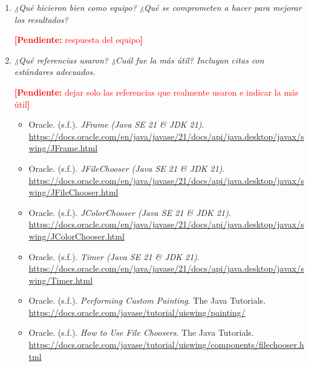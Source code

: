\documentclass[12pt,letterpaper]{article}
\newcommand{\pendiente}[1]{\textcolor{red}{\textbf{[Pendiente:} #1\textbf{]}}}
\newcommand{\enunciado}[1]{\textit{#1}\par}
\begin{document}
\begin{enumerate}
  \item \enunciado{¿Qué hicieron bien como equipo? ¿Qué se comprometen a hacer para mejorar los resultados?}

  \pendiente{respuesta del equipo}

  \item \enunciado{¿Qué referencias usaron? ¿Cuál fue la más útil? Incluyan citas con estándares adecuados.}

  \pendiente{dejar solo las referencias que realmente usaron e indicar la más útil}

  \begin{itemize}
    \item Oracle. (s.f.). \textit{JFrame (Java SE 21 \& JDK 21)}. \url{https://docs.oracle.com/en/java/javase/21/docs/api/java.desktop/javax/swing/JFrame.html}
    \item Oracle. (s.f.). \textit{JFileChooser (Java SE 21 \& JDK 21)}. \url{https://docs.oracle.com/en/java/javase/21/docs/api/java.desktop/javax/swing/JFileChooser.html}
    \item Oracle. (s.f.). \textit{JColorChooser (Java SE 21 \& JDK 21)}. \url{https://docs.oracle.com/en/java/javase/21/docs/api/java.desktop/javax/swing/JColorChooser.html}
    \item Oracle. (s.f.). \textit{Timer (Java SE 21 \& JDK 21)}. \url{https://docs.oracle.com/en/java/javase/21/docs/api/java.desktop/javax/swing/Timer.html}
    \item Oracle. (s.f.). \textit{Performing Custom Painting}. The Java Tutorials. \url{https://docs.oracle.com/javase/tutorial/uiswing/painting/}
    \item Oracle. (s.f.). \textit{How to Use File Choosers}. The Java Tutorials. \url{https://docs.oracle.com/javase/tutorial/uiswing/components/filechooser.html}
  \end{itemize}
\end{enumerate}
\end{document}
